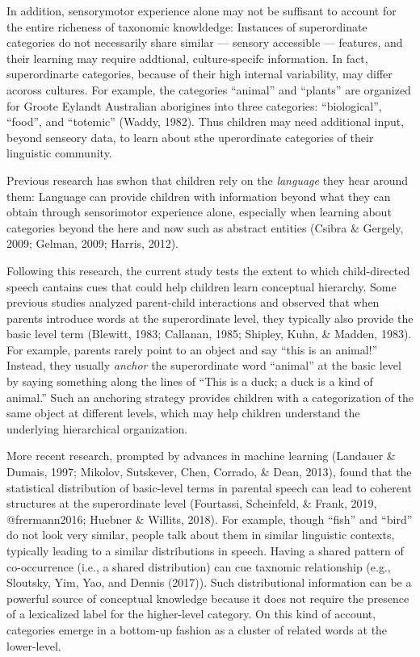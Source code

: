 \documentclass[english,,man,floatsintext]{apa6}
\begin{document}
In addition, sensorymotor experience alone may not be suffisant to account for the entire richeness of taxonomic knowldedge: Instances of superordinate categories do not necessarily share similar --- sensory accessible --- features, and their learning may require addtional, culture-specifc information. In fact, superordinarte categories, because of their high internal variability, may differ acoross cultures. For example, the categories \enquote{animal} and \enquote{plants} are organized for Groote Eylandt Australian aborigines into three categories: \enquote{biological}, \enquote{food}, and \enquote{totemic} (Waddy, 1982). Thus children may need additional input, beyond senseory data, to learn about sthe uperordinate categories of their linguistic community.

Previous research has swhon that children rely on the \emph{language} they hear around them: Language can provide children with information beyond what they can obtain through sensorimotor experience alone, especially when learning about categories beyond the here and now such as abstract entities (Csibra \& Gergely, 2009; Gelman, 2009; Harris, 2012).

Following this research, the current study tests the extent to which child-directed speech cantains cues that could help children learn conceptual hierarchy. Some previous studies analyzed parent-child interactions and observed that when parents introduce words at the superordinate level, they typically also provide the basic level term (Blewitt, 1983; Callanan, 1985; Shipley, Kuhn, \& Madden, 1983). For example, parents rarely point to an object and say \enquote{this is an animal!} Instead, they usually \emph{anchor} the superordinate word \enquote{animal} at the basic level by saying something along the lines of \enquote{This is a duck; a duck is a kind of animal.} Such an anchoring strategy provides children with a categorization of the same object at different levels, which may help children understand the underlying hierarchical organization.

More recent research, prompted by advances in machine learning (Landauer \& Dumais, 1997; Mikolov, Sutskever, Chen, Corrado, \& Dean, 2013), found that the statistical distribution of basic-level terms in parental speech can lead to coherent structures at the superordinate level (Fourtassi, Scheinfeld, \& Frank, 2019, @frermann2016; Huebner \& Willits, 2018). For example, though \enquote{fish} and \enquote{bird} do not look very similar, people talk about them in similar linguistic contexts, typically leading to a similar distributions in speech. Having a shared pattern of co-occurrence (i.e., a shared distribution) can cue taxnomic relationship (e.g., Sloutsky, Yim, Yao, and Dennis (2017)). Such distributional information can be a powerful source of conceptual knowledge because it does not require the presence of a lexicalized label for the higher-level category. On this kind of account, categories emerge in a bottom-up fashion as a cluster of related words at the lower-level.
\end{document}
